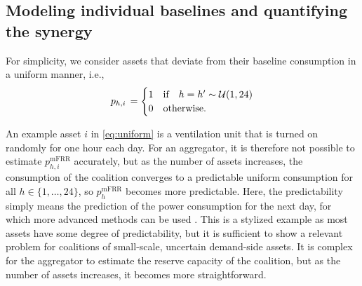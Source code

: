 \documentclass[conference]{IEEEtran}
\begin{document}

\subsection{Modeling individual baselines and quantifying the synergy}
For simplicity, we consider assets that deviate from their baseline consumption in a uniform manner, i.e.,
%
\begin{align}\label{eq:uniform}
    p_{h,i} \thinspace = \begin{cases}
                             1 & \text{if} \quad h = h^{\prime} \sim \mathcal{U}(1,24) \\
                             0 & \text{otherwise.}
                         \end{cases}
\end{align}

An example asset $i$ in \eqref{eq:uniform} is a ventilation unit that is turned on randomly for one hour each day. For an aggregator, it is therefore not possible to estimate $p^{\text{mFRR}}_{h, i}$ accurately, but as the number of assets increases, the consumption of the coalition converges to a predictable uniform consumption for all $h \in \{1, \hdots, 24 \}$, so $p^{\text{mFRR}}_{h}$ becomes more predictable. Here, the predictability simply means the prediction of the power consumption for the next day, for which more advanced methods can be used \cite{ziras2021baselines}.
This is a stylized example as most assets have some degree of predictability, but it is sufficient to show a  relevant problem for coalitions of small-scale, uncertain demand-side assets. It is complex for the aggregator to estimate the reserve capacity of the coalition, but as the number of assets increases, it becomes more straightforward.
\end{document}
